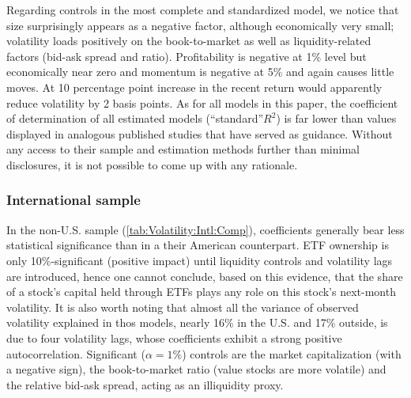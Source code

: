 Regarding controls in the most complete and standardized model, we notice that size surprisingly appears as a negative factor, although economically very small; volatility loads positively on the book-to-market as well as liquidity-related factors (bid-ask spread and \textcite{Amihud2002} ratio). Profitability is negative at 1\% level but economically near zero and momentum is negative at 5\% and again causes little moves. At 10 percentage point increase in the recent return would apparently reduce volatility by 2 basis points. As for all models in this paper, the coefficient of determination of all estimated models (``standard''$ R^2$) is far lower than values displayed in analogous published studies that have served as guidance. Without any access to their sample and estimation methods further than minimal disclosures, it is not possible to come up with any rationale.



\begin{landscape}
  {\linespread{1.0}
    
  }
\end{landscape}

\subsubsection{International sample}
In the non-U.S. sample (\autoref{tab:Volatility:Intl:Comp}), coefficients generally bear less statistical significance than in a their American counterpart. ETF ownership is only 10\%-significant (positive impact) until liquidity controls and volatility lags are introduced, hence one cannot conclude, based on this evidence, that the share of a stock's capital held through ETFs plays any role on this stock's next-month volatility. It is also worth noting that almost all the variance of observed volatility explained in thos models, nearly 16\% in the U.S. and 17\% outside, is due to four volatility lags, whose coefficients exhibit a strong positive autocorrelation. Significant ($\alpha = 1\%$) controls are the market capitalization (with a negative sign), the book-to-market ratio (value stocks are more volatile) and the relative bid-ask spread, acting as an illiquidity proxy.

